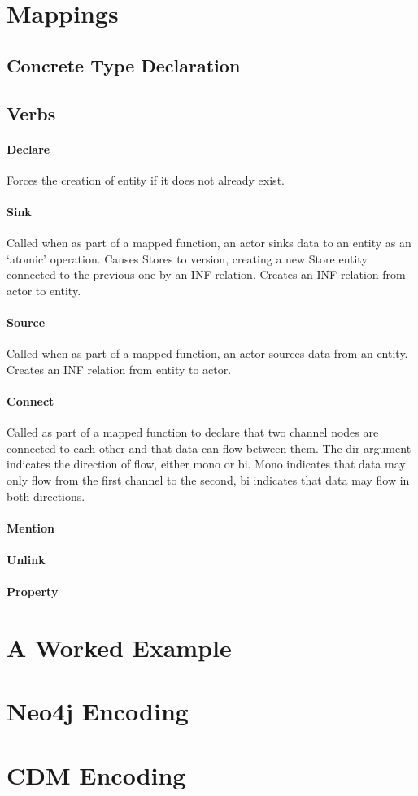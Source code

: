 \documentclass[12pt,twoside,a4paper]{article}
\begin{document}
\section{Mappings}

\subsection{Concrete Type Declaration}

\subsection{Verbs}

\paragraph{Declare}
Forces the creation of entity if it does not already exist.

\paragraph{Sink}
Called when as part of a mapped function, an actor sinks data to an entity as an ‘atomic’ operation.
Causes Stores to version, creating a new Store entity connected to the previous one by an INF relation.
Creates an INF relation from actor to entity. 

\paragraph{Source}
Called when as part of a mapped function, an actor sources data from an entity.
Creates an INF relation from entity to actor.

\paragraph{Connect}
Called as part of a mapped function to declare that two channel nodes are connected to each other and that data can flow between them. The dir argument indicates the direction of flow, either mono or bi. Mono indicates that data may only flow from the first channel to the second, bi indicates that data may flow in both directions. 

\paragraph{Mention}

\paragraph{Unlink}

\paragraph{Property}

\appendix

\section{A Worked Example}

\section{Neo4j Encoding}

\section{CDM Encoding}
\end{document}
